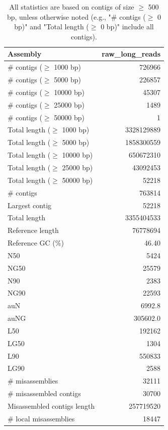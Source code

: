 \documentclass[12pt,a4paper]{article}
\begin{document}
\begin{table}[ht]
\begin{center}
\caption{All statistics are based on contigs of size $\geq$ 500 bp, unless otherwise noted (e.g., "\# contigs ($\geq$ 0 bp)" and "Total length ($\geq$ 0 bp)" include all contigs).}
\begin{tabular}{|l*{1}{|r}|}
\hline
Assembly & raw\_long\_reads \\ \hline
\# contigs ($\geq$ 1000 bp) & 726966 \\ \hline
\# contigs ($\geq$ 5000 bp) & 226857 \\ \hline
\# contigs ($\geq$ 10000 bp) & 45307 \\ \hline
\# contigs ($\geq$ 25000 bp) & 1489 \\ \hline
\# contigs ($\geq$ 50000 bp) & 1 \\ \hline
Total length ($\geq$ 1000 bp) & 3328129889 \\ \hline
Total length ($\geq$ 5000 bp) & 1858300559 \\ \hline
Total length ($\geq$ 10000 bp) & 650672310 \\ \hline
Total length ($\geq$ 25000 bp) & 43092453 \\ \hline
Total length ($\geq$ 50000 bp) & 52218 \\ \hline
\# contigs & 763814 \\ \hline
Largest contig & 52218 \\ \hline
Total length & 3355404533 \\ \hline
Reference length & 76778694 \\ \hline
Reference GC (\%) & 46.40 \\ \hline
N50 & 5424 \\ \hline
NG50 & 25579 \\ \hline
N90 & 2383 \\ \hline
NG90 & 22593 \\ \hline
auN & 6992.8 \\ \hline
auNG & 305602.0 \\ \hline
L50 & 192162 \\ \hline
LG50 & 1304 \\ \hline
L90 & 550833 \\ \hline
LG90 & 2588 \\ \hline
\# misassemblies & 32111 \\ \hline
\# misassembled contigs & 30700 \\ \hline
Misassembled contigs length & 257719520 \\ \hline
\# local misassemblies & 18447 \\ \hline

\end{tabular}
\end{center}
\end{table}
\end{document}
